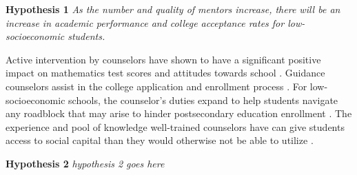 \textbf{Hypothesis 1} \textit{As the number and quality of mentors increase, there will be an increase in academic performance and college acceptance rates for low-socioeconomic students.}

Active intervention by counselors have shown to have a significant positive impact on mathematics test scores and attitudes towards school \parencite[][]{lee1993}. 
Guidance counselors assist in the college application and enrollment process \parencite[][]{deslonde2018high,tang2019high}.
For low-socioeconomic schools, the counselor's duties expand to help students navigate any roadblock that may arise to hinder postsecondary education enrollment \parencite{farmer2006, deslonde2018high}. 
The experience and pool of knowledge well-trained counselors have can give students access to social capital than they would otherwise not be able to utilize \parencite{tang2019high}.

\textbf{Hypothesis 2} \textit{ hypothesis 2 goes here}
